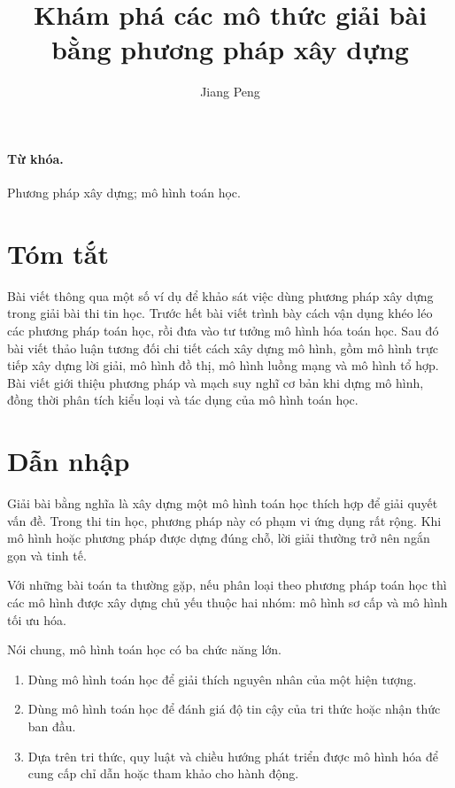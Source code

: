 \documentclass[11pt]{article}
\title{Khám phá các mô thức giải bài bằng phương pháp xây dựng}
\author{Jiang Peng}
\date{}
\begin{document}
\maketitle


\paragraph{Từ khóa.}
Phương pháp xây dựng; mô hình toán học.

\section*{Tóm tắt}

Bài viết thông qua một số ví dụ để khảo sát việc dùng phương pháp xây dựng
trong giải bài thi tin học. Trước hết bài viết trình bày cách vận dụng khéo
léo các phương pháp toán học, rồi đưa vào tư tưởng mô hình hóa toán học. Sau
đó bài viết thảo luận tương đối chi tiết cách xây dựng mô hình, gồm mô hình
trực tiếp xây dựng lời giải, mô hình đồ thị, mô hình luồng mạng và mô hình
tổ hợp. Bài viết giới thiệu phương pháp và mạch suy nghĩ cơ bản khi dựng mô
hình, đồng thời phân tích kiểu loại và tác dụng của mô hình toán học.

\renewcommand{\contentsname}{Mục lục}
\tableofcontents

\section{Dẫn nhập}

Giải bài bằng  nghĩa là xây dựng một mô hình toán
học thích hợp để giải quyết vấn đề. Trong thi tin học, phương pháp này có
phạm vi ứng dụng rất rộng. Khi mô hình hoặc phương pháp được dựng đúng chỗ,
lời giải thường trở nên ngắn gọn và tinh tế.

Với những bài toán ta thường gặp, nếu phân loại theo phương pháp toán học thì
các mô hình được xây dựng chủ yếu thuộc hai nhóm: mô hình sơ cấp và mô hình
tối ưu hóa.

Nói chung, mô hình toán học có ba chức năng lớn.

\begin{enumerate}
  \item {} Dùng mô hình toán học để giải thích nguyên nhân
  của một hiện tượng.
  \item {} Dùng mô hình toán học để đánh giá độ tin cậy của
  tri thức hoặc nhận thức ban đầu.
  \item {} Dựa trên tri thức, quy luật và chiều hướng phát triển
  được mô hình hóa để cung cấp chỉ dẫn hoặc tham khảo cho hành động.
\end{enumerate}
\end{document}
